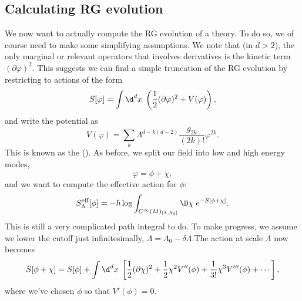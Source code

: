 \documentclass[a4paper]{article}
\begin{document}
%
%
%

\subsection{Calculating RG evolution}
We now want to actually compute the RG evolution of a theory. To do so, we of course need to make some simplifying assumptions. We note that (in $d > 2$), the only marginal or relevant operators that involves derivatives is the kinetic term $(\partial \varphi)^2$. This suggests we can find a simple truncation of the RG evolution by restricting to actions of the form
\[
  S[\varphi] = \int \d^d x\; \left(\frac{1}{2} (\partial \varphi)^2 + V(\varphi)\right),
\]
and write the potential as
\[
  V(\varphi) = \sum_k\Lambda^{d - k(d - 2)} \frac{g_{2k}}{(2k)!} \varphi^{2k}.
\]
This is known as the  ().  As before, we split our field into low and high energy modes,
\[
  \varphi = \phi + \chi,
\]
and we want to compute the effective action for $\phi$:
\[
  S_{\Lambda}^{\mathrm{eff}} [\phi] = - \hbar \log \int_{C^\infty(M)_{[\Lambda, \Lambda_0]}} \D \chi\; e^{-S[\phi + \chi]}.
\]
This is still a very complicated path integral to do. To make progress, we assume we lower the cutoff just infinitesimally, $\Lambda = \Lambda_0 - \delta \Lambda$.The action at scale $\Lambda$ now becomes
\[
  S[\phi + \chi] = S[\phi] + \int \d^d x\; \left[\frac{1}{2} (\partial \chi)^2 + \frac{1}{2} \chi^2 V''(\phi) + \frac{1}{3!} \chi^3 V'''(\phi) + \cdots\right],
\]
where we've chosen $\phi$ so that $V'(\phi) = 0$. %
\end{document}
